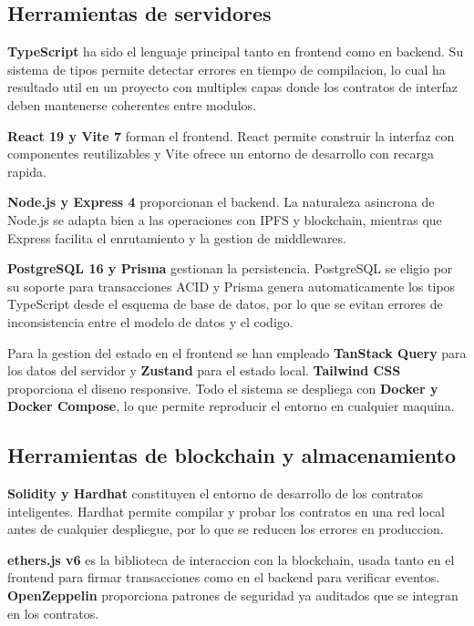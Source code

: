 \documentclass[11pt, a4paper]{article}
\begin{document}
\subsection{Herramientas de servidores}

\noindent \textbf{TypeScript} ha sido el lenguaje principal tanto en frontend como en backend. Su sistema de tipos permite detectar errores en tiempo de compilacion, lo cual ha resultado util en un proyecto con multiples capas donde los contratos de interfaz deben mantenerse coherentes entre modulos.

\noindent \textbf{React 19 y Vite 7} forman el frontend. React permite construir la interfaz con componentes reutilizables y Vite ofrece un entorno de desarrollo con recarga rapida.

\noindent \textbf{Node.js y Express 4} proporcionan el backend. La naturaleza asincrona de Node.js se adapta bien a las operaciones con IPFS y blockchain, mientras que Express facilita el enrutamiento y la gestion de middlewares.

\noindent \textbf{PostgreSQL 16 y Prisma} gestionan la persistencia. PostgreSQL se eligio por su soporte para transacciones ACID y Prisma genera automaticamente los tipos TypeScript desde el esquema de base de datos, por lo que se evitan errores de inconsistencia entre el modelo de datos y el codigo.

\noindent Para la gestion del estado en el frontend se han empleado \textbf{TanStack Query} para los datos del servidor y \textbf{Zustand} para el estado local. \textbf{Tailwind CSS} proporciona el diseno responsive. Todo el sistema se despliega con \textbf{Docker y Docker Compose}, lo que permite reproducir el entorno en cualquier maquina.

\subsection{Herramientas de blockchain y almacenamiento}

\noindent \textbf{Solidity y Hardhat} constituyen el entorno de desarrollo de los contratos inteligentes. Hardhat permite compilar y probar los contratos en una red local antes de cualquier despliegue, por lo que se reducen los errores en produccion.

\noindent \textbf{ethers.js v6} es la biblioteca de interaccion con la blockchain, usada tanto en el frontend para firmar transacciones como en el backend para verificar eventos. \textbf{OpenZeppelin} proporciona patrones de seguridad ya auditados que se integran en los contratos.
\end{document}
